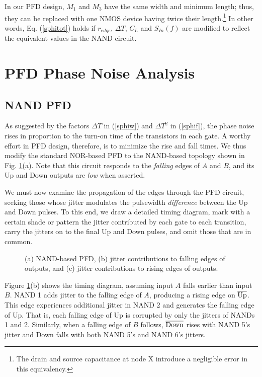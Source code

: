 In our PFD design, $M_1$ and $M_3$ have the same width and minimum length; thus, they can be replaced with one NMOS device having twice their
length.\footnote{The drain and source capacitance at node X introduce a negligible error in this equivalency.}
In other words, Eq. (\ref{sphitot}) holds if $r_{edge}$, $\Delta T$, $C_L$ and $S_{In}(f)$ are modified to reflect the equivalent values
in the NAND circuit.




\section{PFD Phase Noise Analysis}
\subsection{NAND PFD}
As suggested by the factors ${\Delta T}$ in (\ref{sphiw}) and $\Delta T^2$ in (\ref{sphif}), the phase noise rises in proportion to
the turn-on time of the transistors in each gate. A worthy effort in PFD design, therefore, is to minimize the rise and
fall times. We thus modify the standard NOR-based PFD to the NAND-based topology shown in Fig. \ref{pfdnand}(a). Note that this circuit
responds to the {\em falling} edges of $A$ and $B$, and its Up and Down outputs are {\em low} when asserted.

We must now examine the propagation of the edges through the PFD circuit, seeking those whose jitter modulates the
pulsewidth {\em difference} between the Up and Down pulses. To this end, we draw a detailed timing diagram, mark with a certain shade or
pattern the
jitter contributed by each gate to each transition, carry the jitters on to the final Up and Down
pulses, and omit those that are in common.
\begin{figure}[htb]
\vspace{6.2in}
\caption{(a) NAND-based PFD, (b) jitter contributions to falling edges of outputs, and (c) jitter contributions to rising edges of outputs.}
\label{pfdnand}
\end{figure}

Figure \ref{pfdnand}(b) shows the timing diagram, assuming input $A$ falls earlier than input $B$. NAND 1 adds jitter to the
falling edge of $A$, producing a rising edge on $\overline{\rm Up}$. This edge experiences additional jitter in NAND 2 and
generates the falling edge of Up. That is, each falling edge of Up is corrupted by only the jitters of NANDs 1 and 2.
Similarly, when a falling edge of $B$ follows, $\overline{\rm Down}$ rises with NAND 5's jitter and Down falls with both
NAND 5's and NAND 6's jitters.

